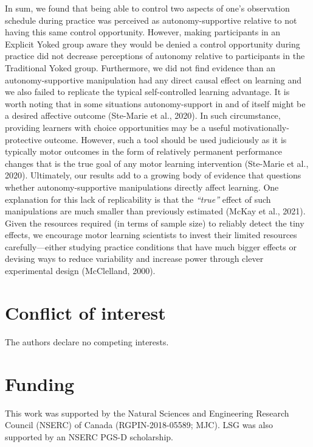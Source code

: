 \documentclass[
  english,
  jou]{apa7}
\begin{document}
In sum, we found that being able to control two aspects of one's observation schedule during practice was perceived as autonomy-supportive relative to not having this same control opportunity. However, making participants in an Explicit Yoked group aware they would be denied a control opportunity during practice did not decrease perceptions of autonomy relative to participants in the Traditional Yoked group. Furthermore, we did not find evidence than an autonomy-supportive manipulation had any direct causal effect on learning and we also failed to replicate the typical self-controlled learning advantage. It is worth noting that in some situations autonomy-support in and of itself might be a desired affective outcome (Ste-Marie et al., 2020). In such circumstance, providing learners with choice opportunities may be a useful motivationally-protective outcome. However, such a tool should be used judiciously as it is typically motor outcomes in the form of relatively permanent performance changes that is the true goal of any motor learning intervention (Ste-Marie et al., 2020). Ultimately, our results add to a growing body of evidence that questions whether autonomy-supportive manipulations directly affect learning. One explanation for this lack of replicability is that the \emph{``true''} effect of such manipulations are much smaller than previously estimated (McKay et al., 2021). Given the resources required (in terms of sample size) to reliably detect the tiny effects, we encourage motor learning scientists to invest their limited resources carefully---either studying practice conditions that have much bigger effects or devising ways to reduce variability and increase power through clever experimental design (McClelland, 2000).

\hypertarget{conflict-of-interest}{%
\section{Conflict of interest}\label{conflict-of-interest}}

The authors declare no competing interests.

\hypertarget{funding}{%
\section{Funding}\label{funding}}

This work was supported by the Natural Sciences and Engineering Research Council (NSERC) of Canada (RGPIN-2018-05589; MJC). LSG was also supported by an NSERC PGS-D scholarship.
\end{document}
